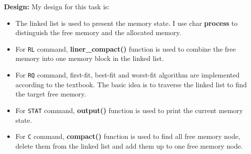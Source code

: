 \documentclass[UTF8,10pt,a4paper]{article}
\theoremstyle{Problem}
\theoremstyle{Solution}
\begin{document}
\textbf{Design:} My design for this task is:
\begin{itemize}
  \item The linked list is used to present the memory state. I use char \textbf{process} to distinguish the free memory and the allocated memory.
  \item For \texttt{RL} command, \textbf{liner\_compact()} function is used to combine the free memory into one memory block in the linked list.
  \item For \texttt{RQ} command, first-fit, best-fit and worst-fit algorithm are implemented according to the textbook. The basic idea is to traverse the linked list to find the target free memory.
  \item For \texttt{STAT} command, \textbf{output()} function is used to print the current memory state.
  \item For \texttt{C} command, \textbf{compact()} function is used to find all free memory node, delete them from the linked list and add them up to one free memory node.
\end{itemize}
\end{document}

